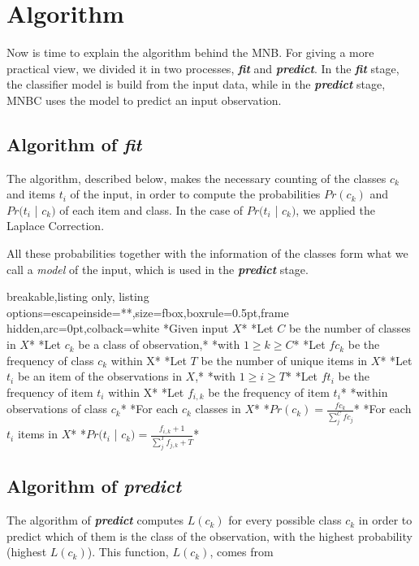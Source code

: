 \section{Algorithm}
\label{sec:algorithm}
Now is time to explain the algorithm behind the MNB. For giving a more practical view, we divided it in two processes, \textbf{\textit{fit}} and \textbf{\textit{predict}}. In the \textbf{\textit{fit}} stage, the classifier model is build from the input data, while in the \textbf{\textit{predict}} stage, MNBC uses the model to predict an input observation.

\subsection{Algorithm of \textit{fit}}

The algorithm, described below, makes the necessary counting of the classes $c_k$ and items $t_i$ of the input, in order to compute the probabilities $Pr(c_k)$ and $Pr(t_i$ | $c_k)$ of each item and class. In the case of $Pr(t_i$ | $c_k)$, we applied the Laplace Correction. 

All these probabilities together with the information of the classes form what we call a \textit{model} of the input, which is used in the \textbf{\textit{predict}} stage.

\begin{tcblisting}{breakable,listing only,
    listing options={escapeinside={*}{*}},size=fbox,boxrule=0.5pt,frame hidden,arc=0pt,colback=white}
*Given input $X$*
    *Let $C$ be the number of classes in $X$*
    *Let $c_k$ be a class of observation,*
        *with $1 \geq k \geq C$*
    *Let $fc_k$ be the frequency of class $c_k$ within X*
    *Let $T$ be the number of unique items in $X$*
    *Let $t_i$ be an item of the observations in $X$,*
        *with $1 \geq i \geq T$*
    *Let $ft_i$ be the frequency of item $t_i$ within X*
    *Let $f_{i,k}$ be the frequency of item $t_i$* 
        *within observations of class $c_k$*
    *For each $c_k$ classes in $X$*
        *$Pr(c_k) = \frac{fc_k}{\sum_j^C{fc_j}}$*
        *For each $t_i$ items in $X$*
            *$Pr(t_i$ | $c_k) = \frac{f_{i,k} + 1}{\sum_j^T{f_{j,k}} + T}$*
\end{tcblisting}

\subsection{Algorithm of \textit{predict}}
The algorithm of \textbf{\textit{predict}} computes $L(c_k)$ for every possible class $c_k$ in order to predict which of them is the class of the observation, with the highest probability (highest $L(c_k)$). This function, $L(c_k)$, comes from 

